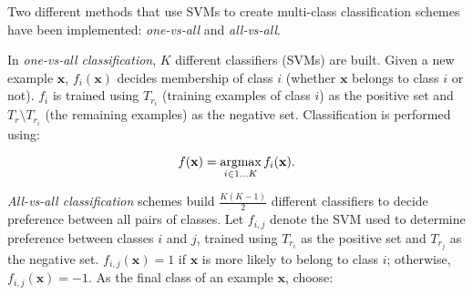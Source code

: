 \documentclass[12pt,twoside,notitlepage,amsart]{report} %
\begin{document}
	Two different methods that use SVMs to create multi-class classification schemes have been implemented: \emph{one-vs-all} and \emph{all-vs-all}. 
	
	
	\newcommand{\argmax}{\operatornamewithlimits{argmax}}
	
	
	
	In \emph{one-vs-all classification}, $K$ different classifiers (SVMs) are built. Given a new example $\mathbf{x}$, $f_i(\mathbf{x})$ decides membership of class $i$ (whether $\mathbf{x}$ belongs to class $i$ or not). $f_i$ is trained using $T_{r_i}$ (training examples of class $i$) as the positive set and $T_r \setminus T_{r_i}$ (the remaining examples) as the negative set. Classification is performed using: 
	
	
	\begin{equation} \displaystyle f(\mathbf{x}) = \argmax_{i \in 1 \ldots K} f_i(\mathbf{x}). \end{equation}

	
	
 \emph{All-vs-all classification} schemes build $\frac{K (K-1)}{2}$ different classifiers to decide preference between all pairs of classes. Let $f_{i,j}$ denote the SVM used to determine preference between classes $i$ and $j$, trained using $T_{r_i}$ as the positive set and $T_{r_j}$ as the negative set. $f_{i,j}(\mathbf{x})=1$ if $\mathbf{x}$ is more likely to belong to class $i$; otherwise, $f_{i,j}(\mathbf{x})=-1$. As the final class of an example $\mathbf{x}$, choose: 
	
\end{document}
